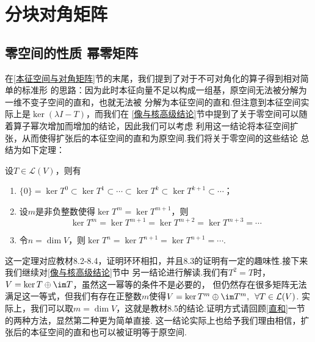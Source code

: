 \section{分块对角矩阵}
\subsection{零空间的性质 \quad 幂零矩阵}
在\ref{本征空间与对角矩阵}节的末尾，我们提到了对于不可对角化的算子得到相对简单的标准形
的思路：因为此时本征向量不足以构成一组基，原空间无法被分解为一维不变子空间的直和，也就无法被
分解为本征空间的直和.但注意到本征空间实际上是$\ker (\lambda I-T)$，而我们在
\ref{像与核高级结论}节中提到了关于零空间可以随着算子幂次增加而增加的结论，因此我们可以考虑
利用这一结论将本征空间扩张，从而使得扩张后的本征空间的直和为原空间.我们将关于零空间的这些结论
总结为如下定理：
\begin{theorem}\label{thm:16:零空间性质}
    设$T\in \mathcal{L}(V)$，则有
    \begin{enumerate}
        \item $\{0\}=\ker T^0\subset\ker T^1\subset\cdots\subset
        \ker T^k\subset\ker T^{k+1}\subset\cdots$；

        \item 设$m$是非负整数使得$\ker T^m=\ker T^{m+1}$，则
        \[\ker T^m=\ker T^{m+1}=\ker T^{m+2}=\ker T^{m+3}=\cdots\]

        \item 令$n=\dim V$，则$\ker T^n=\ker T^{n+1}=\ker T^{n+1}=\cdots$.
    \end{enumerate}
\end{theorem}
这一定理对应教材8.2-8.4，证明环环相扣，并且8.3的证明有一定的趣味性.接下来我们继续对\ref{像与核高级结论}节中
另一结论进行解读.我们有$T^2=T$时，$V=\ker T\oplus\im T$，虽然这一幂等的条件不是必要的，
但仍然存在很多矩阵无法满足这一等式，但我们有存在正整数$m$使得$V=\ker T^m\oplus\im T^m,\enspace\forall T\in \mathcal{L}(V)$.
实际上，我们可以取$m=\dim V$，这就是教材8.5的结论.证明方式请回顾\ref{直和}一节的两种方法，显然第二种更为简单直接.
这一结论实际上也给予我们理由相信，扩张后的本征空间的直和也可以被证明等于原空间.

